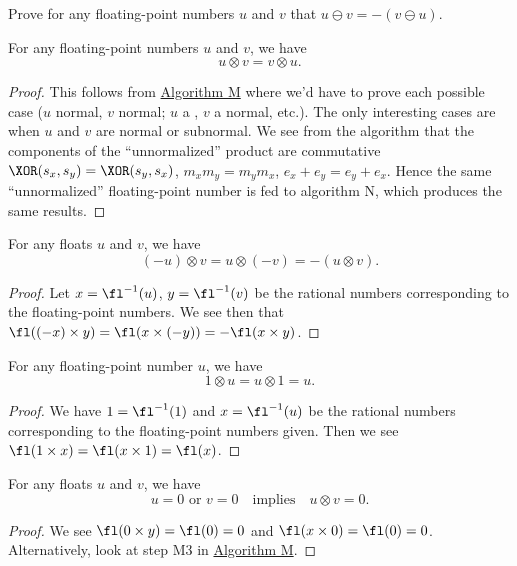 \begin{xca}
  Prove for any floating-point numbers $u$ and $v$ that
  $u\ominus v=-(v\ominus u)$.
\end{xca}

\begin{thm}
  For any floating-point numbers $u$ and $v$, we have
  \begin{equation*}
    u\otimes v=v\otimes u.
  \end{equation*}
\end{thm}
\begin{proof}
  This follows from \hyperref[alg:float-multiplication]{Algorithm M}
  where we'd have to prove each possible case ($u$ normal, $v$ normal;
  $u$ a \NaN, $v$ a normal, etc.). The only interesting cases are when $u$
  and $v$ are normal or subnormal. We see from the algorithm that the
  components of the ``unnormalized'' product are commutative
  $\XOR(s_{x},s_{y})=\XOR(s_{y},s_{x})$, $m_x m_y = m_y m_x$,
  $e_x + e_y = e_y + e_x$. Hence the same ``unnormalized''
  floating-point number is fed to algorithm N, which produces the same
  results.
\end{proof}

\begin{thm}
  For any floats $u$ and $v$, we have
  \begin{equation*}
    (-u)\otimes v = u\otimes(-v) =  -(u\otimes v).
  \end{equation*}
\end{thm}
\begin{proof}
  Let $x=\fl^{-1}(u)$, $y=\fl^{-1}(v)$ be the rational numbers
  corresponding to the floating-point numbers. We see then that
  $\fl((-x)\times y) = \fl(x\times(-y)) = -\fl(x\times y)$.
\end{proof}

\begin{thm}
  For any floating-point number $u$, we have
  \begin{equation*}
    1\otimes u = u\otimes 1 = u.
  \end{equation*}
\end{thm}
\begin{proof}
  We have $1=\fl^{-1}(1)$ and $x=\fl^{-1}(u)$ be the rational numbers
  corresponding to the floating-point numbers given. Then we see
  $\fl(1\times x)=\fl(x\times 1)=\fl(x)$.
\end{proof}

\begin{thm}
  For any floats $u$ and $v$, we have
  \begin{equation*}
    u=0\mbox{ or }v=0\quad\mbox{implies}\quad u\otimes v=0.
  \end{equation*}
\end{thm}
\begin{proof}
  We see $\fl(0\times y)=\fl(0)=0$ and $\fl(x\times0)=\fl(0)=0$.
  Alternatively, look at step M3 in \hyperref[alg:float-multiplication]{Algorithm M}.
\end{proof}

